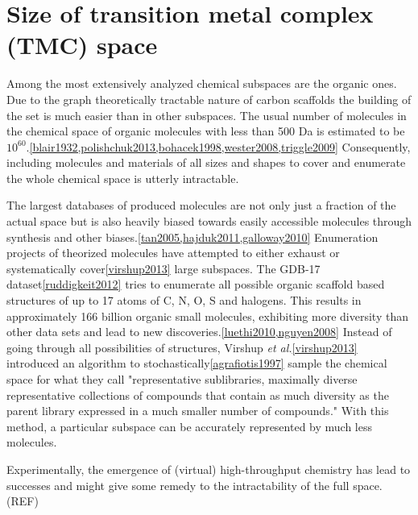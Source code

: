 \documentclass{article}
\begin{document}

\section{Size of transition metal complex (TMC) space}
Among the most extensively analyzed chemical subspaces are the organic ones. Due to the graph theoretically tractable nature of carbon scaffolds the building of the set is much easier than in other subspaces. The usual number of molecules in the chemical space of organic molecules with less than 500 Da is estimated to be $10^{60}$.\ref{blair1932,polishchuk2013,bohacek1998,wester2008,triggle2009} Consequently,  including molecules and materials of all sizes and shapes to cover and enumerate the whole chemical space is utterly intractable.
 
The largest databases of produced molecules are not only just a fraction of the actual space but is also heavily biased towards easily accessible molecules through synthesis and other biases.\ref{tan2005,hajduk2011,galloway2010} Enumeration projects of theorized molecules have attempted to either exhaust or systematically cover\ref{virshup2013} large subspaces. The GDB-17 dataset\ref{ruddigkeit2012} tries to enumerate all possible organic scaffold based structures of up to 17 atoms of C, N, O, S and halogens. This results in approximately 166 billion organic small molecules, exhibiting more diversity than other data sets and lead to new discoveries.\ref{luethi2010,nguyen2008} Instead of going through all possibilities of structures, Virshup \textit{et al.}\ref{virshup2013} introduced an algorithm to stochastically\ref{agrafiotis1997} sample the chemical space for what they call "representative sublibraries, maximally diverse representative collections of compounds that contain as much diversity as the parent library expressed in a much smaller number of compounds." With this method, a particular subspace can be accurately represented by much less molecules.

Experimentally, the emergence of (virtual) high-throughput chemistry has lead to successes and might give some remedy to the intractability of the full space.(REF) 
\end{document}
